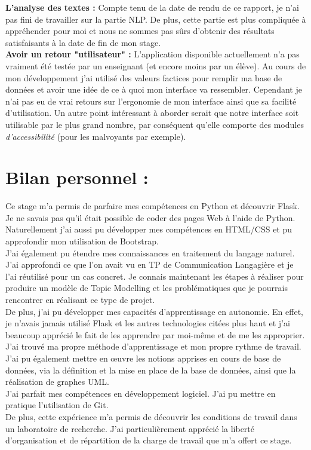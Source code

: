 \documentclass[12pt]{article}
\begin{document}
\textbf{L'analyse des textes :}  Compte tenu de la date de rendu de ce rapport, je n'ai pas fini de travailler sur la partie NLP. De plus, cette partie est plus compliquée à appréhender pour moi et nous ne sommes pas sûrs d'obtenir des résultats satisfaisants à la date de fin de mon stage. \\

\textbf{Avoir un retour "utilisateur" :} L'application disponible actuellement n'a pas vraiment été testée par un enseignant (et encore moins par un élève). Au cours de mon développement j'ai utilisé des valeurs factices pour remplir ma base de données et avoir une idée de ce à quoi mon interface va ressembler. Cependant je n'ai pas eu de vrai retours sur l'ergonomie de mon interface ainsi que sa facilité d'utilisation. 
Un autre point intéressant à aborder serait que notre interface soit utilisable par le plus grand nombre, par conséquent qu'elle comporte des modules \textit{d'accessibilité} (pour les malvoyants par exemple). 


\section{Bilan personnel :}


Ce stage m’a permis de parfaire mes compétences en Python et découvrir Flask. Je ne savais pas qu’il était possible de coder des pages Web à l’aide de Python. Naturellement j’ai aussi pu développer mes compétences en HTML/CSS et pu approfondir mon utilisation de Bootstrap. \\
J'ai également pu étendre mes connaissances en traitement du langage naturel. J'ai approfondi ce que l'on avait vu en TP de Communication Langagière et je l'ai réutilisé pour un cas concret. Je connais maintenant les étapes à réaliser pour produire un modèle de Topic Modelling et les problématiques que je pourrais rencontrer en réalisant ce type de projet. \\
De plus, j'ai pu développer mes capacités d'apprentissage en autonomie. En effet, je n'avais jamais utilisé Flask et les autres technologies citées plus haut et j'ai beaucoup apprécié le fait de les apprendre par moi-même et de me les approprier. J'ai trouvé ma propre méthode d'apprentissage et mon propre rythme de travail. \\
J’ai pu également mettre en œuvre les notions apprises en cours de base de données, via la définition et la mise en place de la base de données, ainsi que la réalisation de graphes UML. \\
J'ai parfait mes compétences en développement logiciel. J'ai pu mettre en pratique l'utilisation de Git. \\
De plus, cette expérience m’a permis de découvrir les conditions de travail dans un laboratoire de recherche. J’ai particulièrement apprécié la liberté d’organisation et de répartition de la charge de travail que m’a offert ce stage. \\
\end{document}
